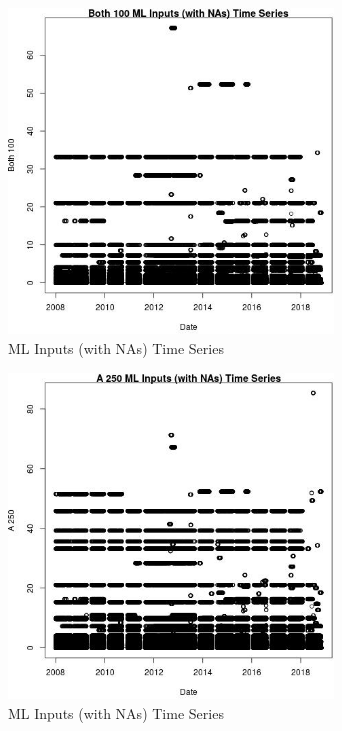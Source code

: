 \begin{figure} 
\centering  
\includegraphics[width=0.77\textwidth]{Code_Outputs/Report_ML_input_PM25_Step4_part_e_de_duplicated_aves_compiled_2019-05-20wNAs_Both_100vDate.jpg} 
\caption{\label{fig:Report_ML_input_PM25_Step4_part_e_de_duplicated_aves_compiled_2019-05-20wNAsBoth_100vDate}ML Inputs (with NAs) Time Series} 
\end{figure} 
 

\begin{figure} 
\centering  
\includegraphics[width=0.77\textwidth]{Code_Outputs/Report_ML_input_PM25_Step4_part_e_de_duplicated_aves_compiled_2019-05-20wNAs_A_250vDate.jpg} 
\caption{\label{fig:Report_ML_input_PM25_Step4_part_e_de_duplicated_aves_compiled_2019-05-20wNAsA_250vDate}ML Inputs (with NAs) Time Series} 
\end{figure} 
 

